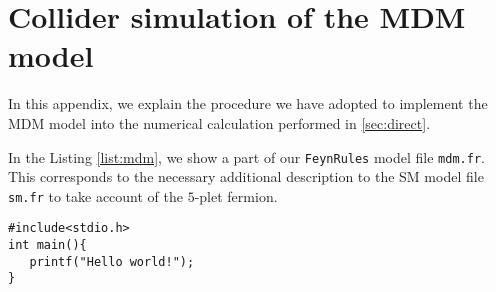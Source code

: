 \documentclass[12pt,twoside,book]{article}
\begin{document}
\section{Collider simulation of the MDM model}
\label{sec:feynrules}

\vskip 0.1in

In this appendix, we explain the procedure we have adopted to implement the MDM model into the numerical calculation performed in \ref{sec:direct}.

In the Listing \ref{list:mdm}, we show a part of our \texttt{FeynRules} model file \texttt{mdm.fr}.
This corresponds to the necessary additional description to the SM model file \texttt{sm.fr} to take account of the $5$-plet fermion.

\begin{lstlisting}[caption=\texttt{mdm.fr}, label=list:mdm, float=b]
#include<stdio.h>
int main(){
   printf("Hello world!");
}
\end{lstlisting}

% 
% 
\end{document}
